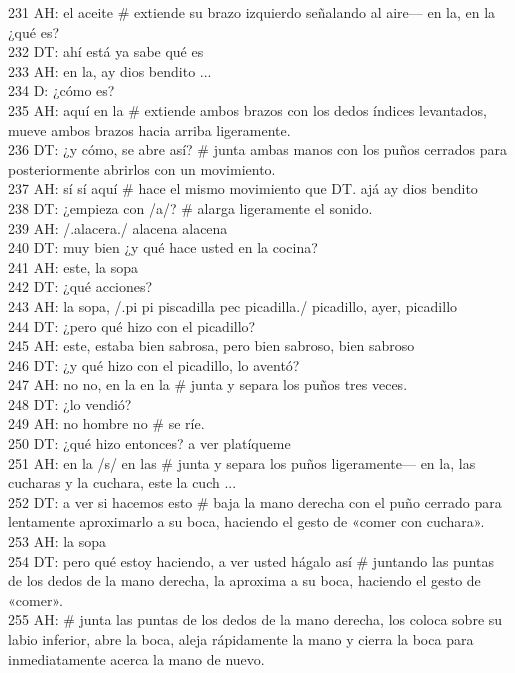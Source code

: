 231 AH: el aceite \# extiende su brazo izquierdo señalando al aire--- en la, en la ¿qué es?\\
232 DT: ahí está ya sabe qué es\\
233 AH: en la, ay dios bendito ...\\
234 D: ¿cómo es?\\
235 AH: aquí en la \# extiende ambos brazos con los dedos índices levantados, mueve ambos brazos hacia arriba ligeramente.\\
236 DT: ¿y cómo, se abre así? \# junta ambas manos con los puños cerrados para posteriormente abrirlos con un movimiento.\\
237 AH: sí sí aquí \# hace el mismo movimiento que DT. ajá ay dios bendito\\
238 DT: ¿empieza con /a/? \# alarga ligeramente el sonido.\\
239 AH: /.alacera./ alacena alacena\\
240 DT: muy bien ¿y qué hace usted en la cocina?\\
241 AH: este, la sopa\\
242 DT: ¿qué acciones?\\
243 AH: la sopa, /.pi pi piscadilla pec picadilla./ picadillo, ayer, picadillo\\
244 DT: ¿pero qué hizo con el picadillo?\\
245 AH: este, estaba bien sabrosa, pero bien sabroso, bien sabroso\\
246 DT: ¿y qué hizo con el picadillo, lo aventó?\\
247 AH: no no, en la en la \# junta y separa los puños tres veces.\\
248 DT: ¿lo vendió?\\
249 AH: no hombre no \# se ríe.\\
250 DT: ¿qué hizo entonces? a ver platíqueme\\
251 AH: en la /s/ en las \# junta y separa los puños ligeramente--- en la, las cucharas y la cuchara, este la cuch ...\\
252 DT: a ver si hacemos esto \# baja la mano derecha con el puño cerrado para lentamente aproximarlo a su boca, haciendo el gesto de «comer con cuchara».\\
253 AH: la sopa\\
254 DT: pero qué estoy haciendo, a ver usted hágalo así \# juntando las puntas de los dedos de la mano derecha, la aproxima a su boca, haciendo el gesto de «comer».\\
255 AH: \# junta las puntas de los dedos de la mano derecha, los coloca sobre su labio inferior, abre la boca, aleja rápidamente la mano y cierra la boca para inmediatamente acerca la mano de nuevo.\\
